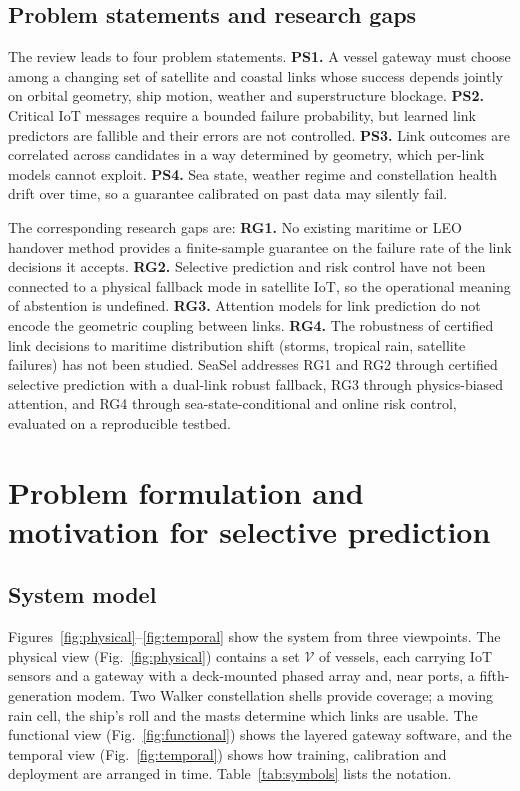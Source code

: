 \subsection{Problem statements and research gaps}
The review leads to four problem statements.
\textbf{PS1.} A vessel gateway must choose among a changing set of satellite and coastal links whose success depends jointly on orbital geometry, ship motion, weather and superstructure blockage.
\textbf{PS2.} Critical IoT messages require a bounded failure probability, but learned link predictors are fallible and their errors are not controlled.
\textbf{PS3.} Link outcomes are correlated across candidates in a way determined by geometry, which per-link models cannot exploit.
\textbf{PS4.} Sea state, weather regime and constellation health drift over time, so a guarantee calibrated on past data may silently fail.

The corresponding research gaps are:
\textbf{RG1.} No existing maritime or LEO handover method provides a finite-sample guarantee on the failure rate of the link decisions it accepts\cite{wu2019,chen2024ho,chen2026sr}.
\textbf{RG2.} Selective prediction and risk control\cite{bates2021,angelopoulos2025,hendrickx2024} have not been connected to a physical fallback mode in satellite IoT, so the operational meaning of abstention is undefined.
\textbf{RG3.} Attention models for link prediction do not encode the geometric coupling between links\cite{brauwers2023}.
\textbf{RG4.} The robustness of certified link decisions to maritime distribution shift (storms, tropical rain, satellite failures) has not been studied.
SeaSel addresses RG1 and RG2 through certified selective prediction with a dual-link robust fallback, RG3 through physics-biased attention, and RG4 through sea-state-conditional and online risk control, evaluated on a reproducible testbed.

\section{Problem formulation and motivation for selective prediction}\label{sec:problem}
\subsection{System model}
Figures~\ref{fig:physical}--\ref{fig:temporal} show the system from three viewpoints. The physical view (Fig.~\ref{fig:physical}) contains a set $\mathcal V$ of vessels, each carrying IoT sensors and a gateway with a deck-mounted phased array and, near ports, a fifth-generation modem. Two Walker constellation shells provide coverage; a moving rain cell, the ship's roll and the masts determine which links are usable. The functional view (Fig.~\ref{fig:functional}) shows the layered gateway software, and the temporal view (Fig.~\ref{fig:temporal}) shows how training, calibration and deployment are arranged in time. Table~\ref{tab:symbols} lists the notation.

